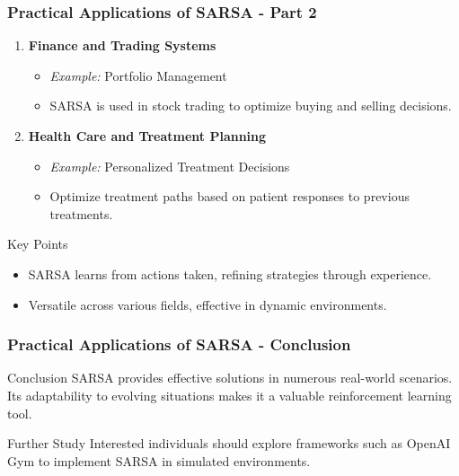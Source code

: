 \documentclass{beamer}
\begin{document}
\begin{frame}[fragile]
    \frametitle{Practical Applications of SARSA - Part 2}
    \begin{enumerate}[resume]
        \item \textbf{Finance and Trading Systems}  
            \begin{itemize}
                \item \textit{Example:} Portfolio Management
                \item SARSA is used in stock trading to optimize buying and selling decisions.
            \end{itemize}

        \item \textbf{Health Care and Treatment Planning}  
            \begin{itemize}
                \item \textit{Example:} Personalized Treatment Decisions
                \item Optimize treatment paths based on patient responses to previous treatments.
            \end{itemize}
    \end{enumerate}

    \begin{block}{Key Points}
        \begin{itemize}
            \item SARSA learns from actions taken, refining strategies through experience.
            \item Versatile across various fields, effective in dynamic environments.
        \end{itemize}
    \end{block}
\end{frame}

\begin{frame}[fragile]
    \frametitle{Practical Applications of SARSA - Conclusion}
    \begin{block}{Conclusion}
        SARSA provides effective solutions in numerous real-world scenarios. Its adaptability to evolving situations makes it a valuable reinforcement learning tool.
    \end{block}
    
    \begin{block}{Further Study}
        Interested individuals should explore frameworks such as OpenAI Gym to implement SARSA in simulated environments.
    \end{block}
\end{frame}
\end{document}
